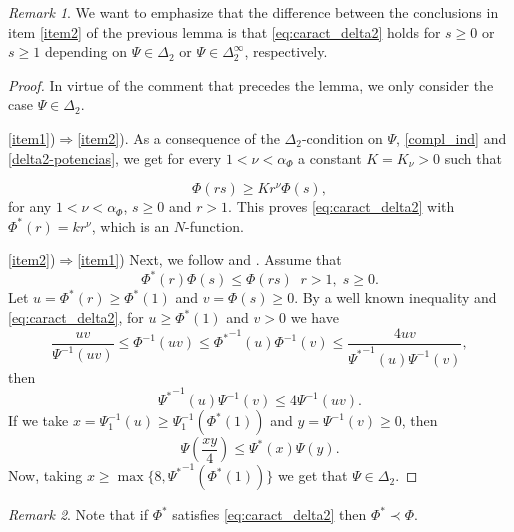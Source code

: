 \documentclass[twoside]{elsarticle}
\theoremstyle{remark}
\newtheorem{comentario}{Remark}
\renewcommand{\leq}{\leqslant}
\renewcommand{\geq}{\geqslant}
\begin{document}
\begin{comentario} We want to emphasize that the difference between the conclusions in item \ref{item2} of the previous lemma
is  that \eqref{eq:caract_delta2} holds for $s\geq 0$ or $s\geq 1$ depending on
$\Psi\in\Delta_2$ or $\Psi\in\Delta_2^{\infty}$,  respectively.

\end{comentario}


\begin{proof}
 In virtue of the comment that precedes the lemma, we only consider the case   $\Psi \in \Delta_2$.

\ref{item1})$\Rightarrow$\ref{item2}).
As a consequence of the $\Delta_2$-condition on $\Psi$, \eqref{compl_ind} and \eqref{delta2-potencias},
we get for every $1<\nu<\alpha_{\Phi}$ a constant $K=K_{\nu}>0$  such that

\begin{equation}\label{delta2-consecuencia}
\Phi(r s)\geq Kr^{\nu}\Phi(s),
\end{equation}
for any $1<\nu<\alpha_{\Phi}$,  $s\geq 0$ and $r>1$. This proves  \eqref{eq:caract_delta2} with $\Phi^*(r)=kr^\nu$, which is an $N$-function.

\ref{item2})$\Rightarrow$\ref{item1})
Next, we follow  \cite[p. 32, Prop. 13]{rao1991theory} and \cite[p. 29, Prop. 9]{rao1991theory}.
Assume that
\[
\Phi^*(r)\Phi(s)\leq \Phi(rs)\;\;r>1,\;s\geq 0.
\]
Let $u=\Phi^*(r)\geq \Phi^*(1)$ and $v=\Phi(s)\geq 0$. By a well known inequality \cite[p. 13, Prop. 1]{rao1991theory} and \eqref{eq:caract_delta2},   for $u\geq \Phi^*(1)$ and $v> 0$ we have
\[
\frac{uv}{\Psi^{-1}(uv)}\leq \Phi^{-1}(uv)\leq{\Phi^*}^{-1}(u)\Phi^{-1}(v)\leq
\frac{4uv}{{\Psi^*}^{-1}(u)\Psi^{-1}(v)},
\]
then
\[
{\Psi^*}^{-1}(u)\Psi^{-1}(v)\leq 4 \Psi^{-1}(uv).
\]
If we take $x=\Psi^{-1}_1(u)\geq \Psi^{-1}_1(\Phi^*(1))$ and $y=\Psi^{-1}(v)\geq 0$, then
\[
\Psi\left(\frac{xy}{4}\right)\leq \Psi^*(x)\Psi(y).
\]
Now, taking  $x\geq \max\{8,{\Psi^*}^{-1}(\Phi^*(1))\}$ we get that $\Psi \in \Delta_2$.
\end{proof}

\begin{comentario} Note that if $\Phi^*$ satisfies \eqref{eq:caract_delta2} then $\Phi^*\prec \Phi$.
 \end{comentario}
\end{document}
